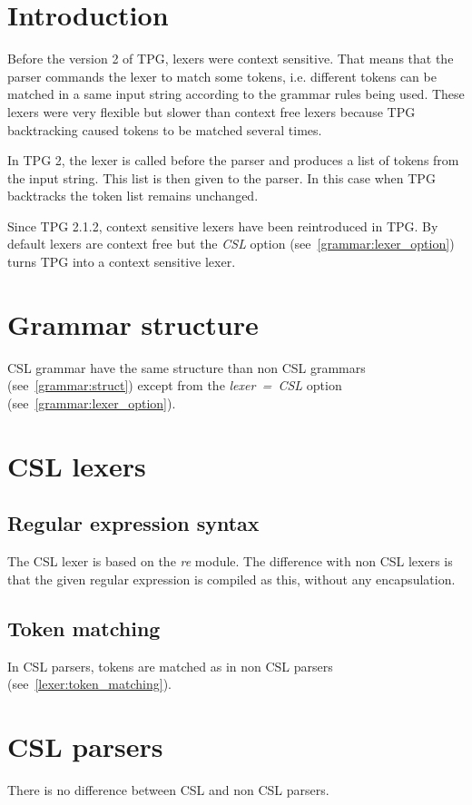 \section{Introduction}          \label{CSL}

Before the version 2 of TPG, lexers were context sensitive.
That means that the parser commands the lexer to match some tokens, i.e. different tokens can be matched in a same input string according to the grammar rules being used.
These lexers were very flexible but slower than context free lexers because TPG backtracking caused tokens to be matched several times.

In TPG 2, the lexer is called before the parser and produces a list of tokens from the input string.
This list is then given to the parser.
In this case when TPG backtracks the token list remains unchanged.

Since TPG 2.1.2, context sensitive lexers have been reintroduced in TPG.
By default lexers are context free but the \emph{CSL} option (see~\ref{grammar:lexer_option}) turns TPG into a context sensitive lexer.

\section{Grammar structure}

CSL grammar have the same structure than non CSL grammars (see~\ref{grammar:struct}) except from the \emph{lexer~=~CSL} option (see~\ref{grammar:lexer_option}).

\section{CSL lexers}

\subsection{Regular expression syntax}

The CSL lexer is based on the \emph{re} module.
The difference with non CSL lexers is that the given regular expression is compiled as this, without any encapsulation.

\subsection{Token matching}

In CSL parsers, tokens are matched as in non CSL parsers (see~\ref{lexer:token_matching}).

\section{CSL parsers}

There is no difference between CSL and non CSL parsers.
